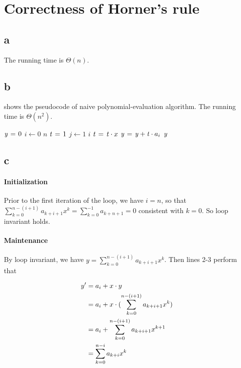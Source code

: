 \section{Correctness of Horner's rule}

\subsection{a}

The running time is $\Theta(n)$.


\subsection{b}

 shows the pseudocode of naive polynomial-evaluation algorithm.
The running time is $\Theta(n^2)$.

\begin{codebox}
\li	$\id{y} \gets 0$
\li	\For $i \gets 0$ \To $n$
\li	\Do
		$\id{t} \gets 1$
\li		\For $j \gets 1$ \To $i$
\li		\Do
			$\id{t} \gets \id{t} \cdot x$
		\End
\li		$\id{y} \gets \id{y} + \id{t} \cdot a_i$
	\End
\li	\Return $\id{y}$
\end{codebox}


\subsection{c}

\paragraph{Initialization}
Prior to the first iteration of the loop, we have $i = n$, so that $\sum_{k = 0}^{n - (i + 1)} a_{k + i + 1} x^k = \sum_{k = 0}^{-1} a_{k + n + 1} = 0$ consistent with $k = 0$. So loop invariant holds.

\paragraph{Maintenance}
By loop invariant, we have $y = \sum_{k = 0}^{n - (i + 1)} a_{k + i + 1} x^k$.
Then lines 2-3 perform that

\begin{equation}\notag
\begin{aligned}
y' &= a_i + x \cdot y\\
&= a_i + x \cdot (\sum_{k = 0}^{n - (i + 1)} a_{k + i + 1} x^k)\\
&= a_i + \sum_{k = 0}^{n - (i + 1)} a_{k + i + 1} x^{k + 1}\\
&= \sum_{k = 0}^{n - i} a_{k + i} x^k
\end{aligned}
\end{equation}

